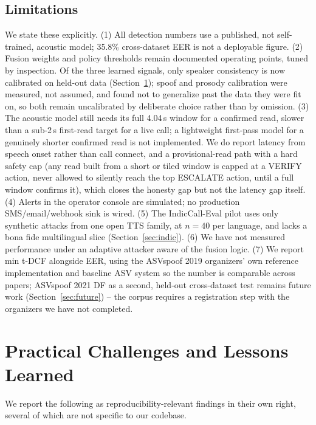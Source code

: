\documentclass[conference]{IEEEtran}
\begin{document}
\subsection{Limitations}
We state these explicitly. (1) All detection numbers use a published,
not self-trained, acoustic model; 35.8\% cross-dataset EER is not a
deployable figure. (2) Fusion weights and policy thresholds remain
documented operating points, tuned by inspection. Of the three learned
signals, only speaker consistency is now calibrated on held-out data
(Section~\ref{sec:lessons}); spoof and prosody calibration were measured,
not assumed, and found not to generalize past the data they were fit on,
so both remain uncalibrated by deliberate choice rather than by omission.
(3) The acoustic
model still needs its full 4.04\,s window for a confirmed read, slower
than a sub-2\,s first-read target for a live call; a lightweight
first-pass model for a genuinely shorter confirmed read is not
implemented. We do report latency from speech onset rather than call
connect, and a provisional-read path with a hard safety cap (any read
built from a short or tiled window is capped at a VERIFY action, never
allowed to silently reach the top ESCALATE action, until a full window
confirms it), which closes the honesty gap but not the latency gap
itself. (4) Alerts in the operator console
are simulated; no production SMS/email/webhook sink is wired. (5) The
IndicCall-Eval pilot uses only synthetic attacks from one open TTS
family, at $n{=}40$ per language, and lacks a bona fide multilingual
slice (Section~\ref{sec:indic}). (6) We have not measured performance
under an adaptive attacker aware of the fusion logic. (7) We report
min t-DCF alongside EER, using the
ASVspoof 2019 organizers' own reference implementation and baseline ASV
system so the number is comparable across papers; ASVspoof 2021 DF as a
second, held-out cross-dataset test remains future work
(Section~\ref{sec:future}) -- the corpus requires a registration step
with the organizers we have not completed.

\section{Practical Challenges and Lessons Learned}
\label{sec:lessons}
We report the following as reproducibility-relevant findings in their
own right, several of which are not specific to our codebase.
\end{document}
